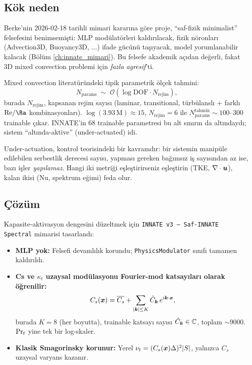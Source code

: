 \subsection*{Kök neden}

Berke'nin 2026-02-18 tarihli mimari kararına göre proje, ``saf-fizik minimalist'' felsefesini benimsemişti: MLP modülatörleri kaldırılacak, fizik nöronları (Advection3D, Buoyancy3D, $\ldots$) ifade gücünü taşıyacak, model yorumlanabilir kalacak (Bölüm \ref{ch:innate_mimari}). Bu felsefe akademik açıdan değerli, fakat 3D mixed convection problemi için \textit{fazla agresif}'ti.

Mixed convection literatüründeki tipik parametrik ölçek tahmini:
\begin{equation}
    N_{\text{params}} \;\sim\; \mathcal{O}\!\left( \log \mathrm{DOF} \cdot N_{\text{rejim}} \right),
\end{equation}
burada $N_{\text{rejim}}$, kapsanan rejim sayısı (laminar, transitional, türbülanslı + farklı $\Rey/\Ra$ kombinasyonları). $\log(3.93\,\mathrm{M}) \approx 15$, $N_{\text{rejim}} = 6$ ile $N_{\text{params}}^{\text{tahmin}} \sim 100$--$300$ trainable çıkar. INNATE'in 68 trainable parametresi bu alt sınırın da altındaydı; sistem ``altında-aktive'' (under-actuated) idi.

Under-actuation, kontrol teorisindeki bir kavramdır: bir sistemin manipüle edilebilen serbestlik derecesi sayısı, yapması gereken bağımsız iş sayısından az ise, bazı işler \textit{yapılamaz}. Hangi iki metriği eşleştirirseniz eşleştirin (TKE, $\nabla \cdot \bm{u}$), kalan ikisi (Nu, spektrum eğimi) feda olur.

\subsection*{Çözüm}

Kapasite-aktivasyon dengesini düzeltmek için \texttt{INNATE v3 --- Saf-INNATE Spectral} mimarisi tasarlandı:

\begin{itemize}
    \item \textbf{MLP yok:} Felsefi devamlılık korundu; \texttt{PhysicsModulator} sınıfı tamamen kaldırıldı.
    \item \textbf{Cs ve $\kappa_t$ uzaysal modülasyonu Fourier-mod katsayıları olarak öğrenilir:}
    \begin{equation}
        C_s(\bm{x}) = \overline{C_s} + \sum_{|\bm{k}| \leq K} \hat{C}_{\bm{k}} \, e^{i\bm{k}\cdot\bm{x}},
    \end{equation}
    burada $K = 8$ (her boyutta), trainable katsayı sayısı $\hat{C}_{\bm{k}} \in \mathbb{C}$, toplam $\sim 9000$. $\mathrm{Pr}_t$ yine tek bir log-skaler.
    \item \textbf{Klasik Smagorinsky korunur:} Yerel $\nu_t = (C_s(\bm{x}) \Delta)^2 |S|$, yalnızca $C_s$ uzaysal varyans kazanır.
\end{itemize}

